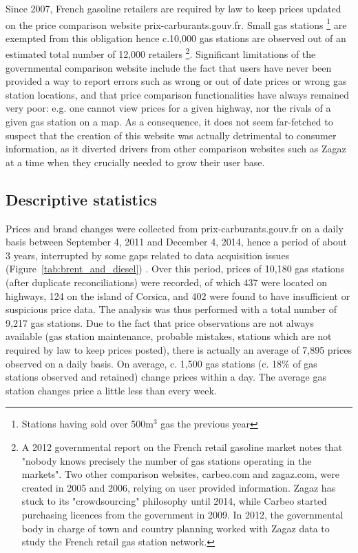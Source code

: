 \documentclass[english]{article}
\begin{document}
Since 2007, French gasoline retailers are required by law to keep prices updated on the price comparison website prix-carburants.gouv.fr. Small gas stations%
\footnote{Stations having sold over 500m$^{3}$ gas the previous year%
} are exempted from this obligation hence c.10,000 gas stations are observed out of an estimated total number of 12,000 retailers%
\footnote{A 2012 governmental report on the French retail gasoline market notes that "nobody knows precisely the number of gas stations operating in the markets". Two other comparison websites, carbeo.com and zagaz.com, were created in 2005 and 2006, relying on user provided information. Zagaz has stuck to its "crowdsourcing" philosophy until 2014, while Carbeo started purchasing licences from the government in 2009. In 2012, the governmental body in charge of town and country planning worked with Zagaz data to study the French retail gas station network.%
}.
Significant limitations of the governmental comparison website include the fact that users have never been provided a way to report errors such as wrong or out of date prices or wrong gas station locations, and that price comparison functionalities have always remained very poor: e.g. one cannot view prices for a given highway, nor the rivals of a given gas station on a map. As a consequence, it does not seem far-fetched to suspect that the creation of this website was actually detrimental to consumer information, as it diverted drivers from other comparison websites such as Zagaz at a time when they crucially needed to grow their user base.

\subsection{Descriptive statistics}

Prices and brand changes were collected from prix-carburants.gouv.fr on a daily basis between September 4, 2011 and December 4, 2014, hence a period of about 3 years, interrupted by some gaps related to data acquisition issues (Figure~\ref{tab:brent_and_diesel}) . Over this period, prices of 10,180 gas stations (after duplicate reconciliations) were recorded, of which 437 were located on highways, 124 on the island of Corsica, and 402 were found to have insufficient or suspicious price data. The analysis was thus performed with a total number of 9,217 gas stations. Due to the fact that price observations are not always available (gas station maintenance, probable mistakes, stations which are not required by law to keep prices posted), there is actually an average of 7,895 prices observed on a daily basis. On average, c. 1,500 gas stations (c. 18\% of gas stations observed and retained) change prices within a day. The average gas station changes price a little less than every week.
\end{document}
